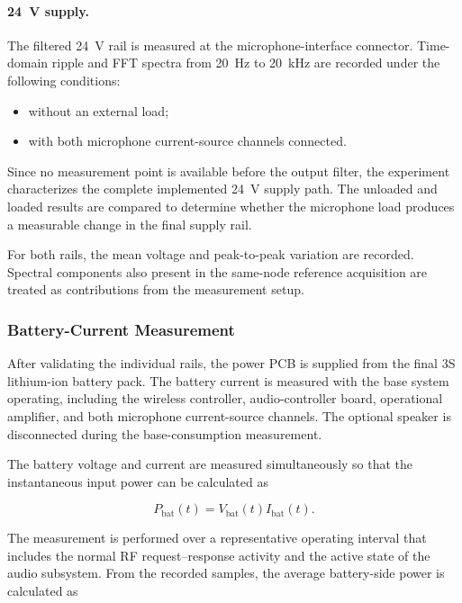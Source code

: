 \paragraph{24~V supply.}

The filtered 24~V rail is measured at the microphone-interface connector. Time-domain ripple and FFT spectra from 20~Hz to 20~kHz are recorded under the following conditions:

\begin{itemize}
    \item without an external load;
    \item with both microphone current-source channels connected.
\end{itemize}

Since no measurement point is available before the output filter, the experiment characterizes the complete implemented 24~V supply path. The unloaded and loaded results are compared to determine whether the microphone load produces a measurable change in the final supply rail.

For both rails, the mean voltage and peak-to-peak variation are recorded. Spectral components also present in the same-node reference acquisition are treated as contributions from the measurement setup.

\subsubsection{Battery-Current Measurement}

After validating the individual rails, the power PCB is supplied from the final 3S lithium-ion battery pack. The battery current is measured with the base system operating, including the wireless controller, audio-controller board, operational amplifier, and both microphone current-source channels. The optional speaker is disconnected during the base-consumption measurement.

The battery voltage and current are measured simultaneously so that the instantaneous input power can be calculated as

\begin{equation}
    P_{\mathrm{bat}}(t)
    =
    V_{\mathrm{bat}}(t)
    I_{\mathrm{bat}}(t).
    \label{eq:measured_battery_power}
\end{equation}

The measurement is performed over a representative operating interval that includes the normal RF request--response activity and the active state of the audio subsystem. From the recorded samples, the average battery-side power is calculated as


